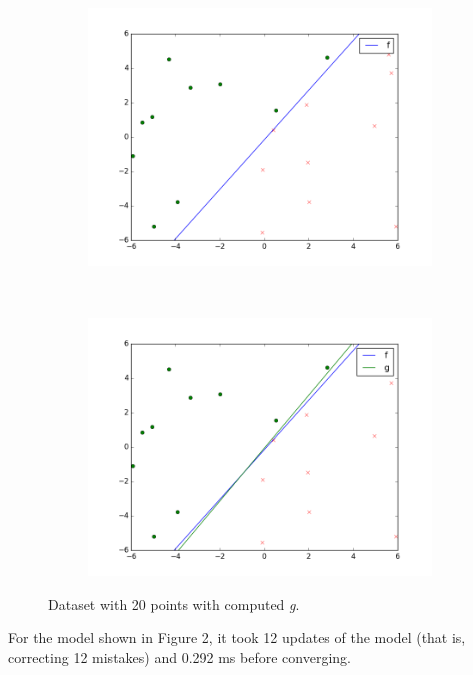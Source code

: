 \documentclass{article}
\begin{document}
\begin{enumerate}[label=(\alph*)]
\begin{figure}[H]
    \centering
    \begin{subfigure}[t]{0.5\textwidth}
        \centering
		\includegraphics[scale=0.35]{images/2_a.png} 
    \end{subfigure}%
    ~ 
    \begin{subfigure}[t]{0.5\textwidth}
        \centering
		\includegraphics[scale=0.35]{images/2_b.png} 
    \end{subfigure}
    \caption{Dataset with 20 points with computed \textit{g}.}
\end{figure}

For the model shown in Figure 2, it took 12 updates of the model (that is, correcting 12 mistakes) and 0.292 ms before converging. 


\end{enumerate}
\end{document}
